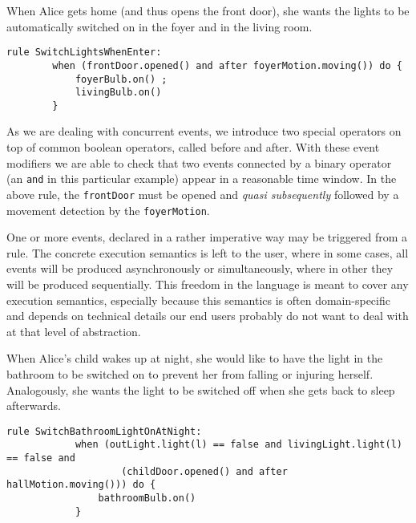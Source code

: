 \begin{description}[leftmargin=0cm]
	\item[Switching entrance lights on when coming in]  When Alice gets home (and thus opens the front door), she wants the lights to be automatically switched on in the foyer and in the living room.
	\begin{lstlisting}[language=iotdsl,label=lis:home-rule,caption=\IOTDSL business rule to switch on the lights when coming home]
	rule SwitchLightsWhenEnter:
		when (frontDoor.opened() and after foyerMotion.moving()) do {
			foyerBulb.on() ;
			livingBulb.on()
		}
	\end{lstlisting}
	As we are dealing with concurrent events, we introduce two special operators on top of common boolean operators, called \textsf{before} and \textsf{after}. With these event modifiers we are able to check that two events connected by a binary operator (an \texttt{and} in this particular example) appear in a reasonable time window. In the above rule, the \texttt{frontDoor} must be opened and \textit{quasi subsequently} followed by a movement detection by the \texttt{foyerMotion}.
	
	One or more events, declared in a rather imperative way may be triggered from a rule. The concrete execution semantics is left to the user, where in some cases, all events will be produced asynchronously or simultaneously, where in other they will be produced sequentially. This freedom in the language is meant to cover any execution semantics, especially because this semantics is often domain-specific and depends on technical details our end users probably do not want to deal with at that level of abstraction.

	\item[Illuminate bathroom when children wake up at night] When Alice's child wakes up at night, she would like to have the light in the bathroom to be switched on to prevent her from falling or injuring herself. Analogously, she wants the light to be switched off when she gets back to sleep afterwards.
	\begin{lstlisting}[language=iotdsl,label=lis:night-rule,caption=\IOTDSL business rules to switch on\//off the lights at night]
		rule SwitchBathroomLightOnAtNight:	
			when (outLight.light(l) == false and livingLight.light(l) == false and 
					(childDoor.opened() and after hallMotion.moving())) do {
				bathroomBulb.on()
			}
  

\end{lstlisting}
\end{description}
